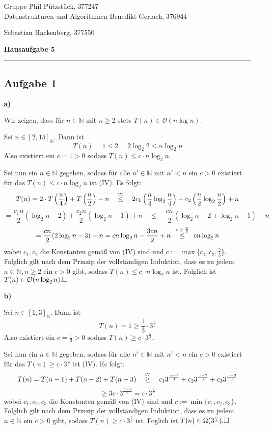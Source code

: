 \documentclass[a4paper,graphics,11pt]{article}
\newcommand{\aufgabe}[1]{\subsection*{Aufgabe #1}}
\newcommand{\up}[2]{\mathrel{\overset{\makebox[0pt]{\mbox{\normalfont\tiny #2}}}{#1}}}
\begin{document}
\noindent Gruppe              \hfill Phil Pützstück, 377247\\
\noindent Datenstrukturen und Algorithmen \hfill Benedikt Gerlach, 376944\\
\strut\hfill Sebastian Hackenberg, 377550\\
\begin{center}
	\LARGE{\textbf{Hausaufgabe 5}}
\end{center}
\begin{center}
\rule[0.1ex]{\textwidth}{1pt}
\end{center}

\aufgabe{1}
\textbf{a)}

Wir zeigen, dass für $n \in \mathbb{N}$ mit $n \geq 2$ stets $T(n) \in \mathcal{O}(n\log n)$.

Sei $n \in [2,15]_\mathbb{N}$. Dann ist
$$
    T(n) = 1 \leq 2 = 2 \log_2 2 \leq n \log_2 n
$$
Also existiert ein $c = 1 > 0$ sodass $T(n) \leq c\cdot n \log_2 n$.

Sei nun ein $n \in \mathbb{N}$ gegeben, sodass für alle $n' \in \mathbb{N}$ mit $n' < n$ ein $c > 0$ existiert für das
$T(n) \leq c \cdot n\log_2 n$ ist (IV). Es folgt:
$$
    T(n) = 2\cdot T\left(\frac{n}{4}\right) + T\left(\frac{n}{2}\right) + n
    \quad\up{\leq}{IV}\quad 2 c_1\left(\frac{n}{4} \log_2 \frac{n}{4}\right) + c_2 \left(\frac{n}{2} \log_2 \frac{n}{2}\right)
    + n
$$$$
    = \frac{c_1n}{2}(\log_2 n - 2) + \frac{c_2n}{2} (\log_2 n - 1) + n
    \quad\leq\quad \frac{cn}{2} (\log_2 n - 2 + \log_2 n - 1) + n
$$$$
    = \frac{cn}{2} (2\log_2 n - 3) + n
    = cn\log_2 n - \frac{3cn}{2} + n
    \quad\up{\leq}{$c \geq \frac{2}{3}$}\quad cn \log_2 n 
$$
wobei $c_1, c_2$ die Konstanten gemäß von (IV) sind und $c := \max \{c_1, c_2, \frac{2}{3}\}$.
Folglich gilt nach dem Prinzip der vollständigen Induktion,
dass es zu jedem $n \in \mathbb{N}, n \geq 2$ ein $c > 0$ gibt, sodass $T(n) \leq c\cdot n\log_2 n$ ist.
Folglich ist $T(n) \in \mathcal{O}(n\log_2n).\hfill\square$

\textbf{b)}

Sei $n \in [1,3]_{\mathbb{N}}$. Dann ist
$$
    T(n) = 1 \geq \frac{1}{3} \cdot 3^{\frac{n}{3}}
$$
Also existiert ein $c = \frac{1}{3} > 0$ sodass $T(n) \geq c\cdot 3^{\frac{n}{3}}$.

Sei nun ein $n \in \mathbb{N}$ gegeben, sodass für alle $n' \in \mathbb{N}$ mit $n' < n$ ein
$c > 0$ existiert für das $T(n) \geq c\cdot 3^{\frac{n}{3}}$ ist (IV). Es folgt:
$$
    T(n)
    = T(n-1) + T(n-2) + T(n-3)
    \quad\up{\geq}{IV}\quad c_1 3^{\frac{n-1}{3}} + c_2 3^{\frac{n-2}{3}} + c_3 3^{\frac{n-3}{3}}
$$$$
    \geq 3c\cdot 3^{\frac{n-3}{3}} = c\cdot3^\frac{3}{n}
$$
wobei $c_1, c_2, c_3$ die Konstanten gemäß von (IV) sind und $c:= \min \{c_1, c_2, c_3\}$.
Folglich gilt nach dem Prinzip der vollständigen Induktion, dass es zu jedem $n \in \mathbb{N}$ ein
$c > 0$ gibt, sodass $T(n) \geq c\cdot 3^{\frac{n}{3}}$ ist.
Foglich ist $T(n) \in \Omega(3^{\frac{n}{3}}). \hfill\square$
\end{document}
